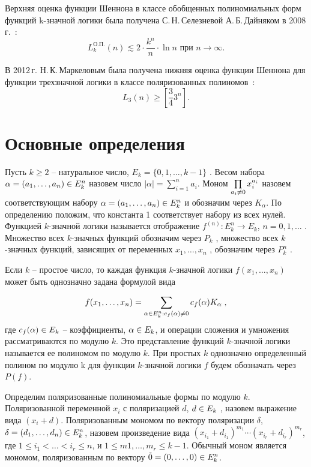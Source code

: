 \documentclass[bibliography=totoc, a4paper, 14pt]{extarticle}
\def\neq{\not=\nobreak\discretionary{}{\usefont{OMS}{cmsy}{m}{n}\char54\usefont{OT1}{cmr}{m}{n}\char61}{}}
\def\in{\mathchar"3232\nobreak\discretionary{}{\usefont{OMS}{cmsy}{m}{n}\char50}{}}
\begin{document}
Верхняя оценка функции Шеннона в классе обобщенных полиномиальных форм функций k\nobreakdash-значной логики была получена
С.\,Н.\,Селезневой А.\,Б.\,Дайняком в 2008\,г.~\cite{sd08}:
$$
L^{\text{О.П.}}_k(n) \lesssim 2\cdot\frac{k ^ n}{n}\cdot \ln n \text{ при } n \rightarrow \infty.
$$

В 2012\,г. Н.\,К.\,Маркеловым была получена нижняя оценка функции Шеннона для функции трехзначной логики в классе
поляризованных полиномов~\cite{mn12}:
$$
L_3(n) \geqslant \left[\frac{3}{4}3^n\right].
$$

\section{Основные определения}

Пусть $k \geqslant 2$ -- натуральное число,
$E_k = \{0, 1, \dots, k - 1\}$
. Весом набора
$\alpha = (a_1, \dots, a_n ) \in E_k^n$ назовем число $|\alpha| = \sum\limits_{i=1}^n a_i$.
Моном $\prod\limits_{a_i\neq0}x_i^{a_i}$ назовем соответствующим набору $\alpha = (a_1, \dots, a_n ) \in E_k^n$ и обозначим
через $K_{\alpha}$. По определению положим, что константа 1 соответствует набору из всех нулей.
Функцией $k$\nobreakdash-значной логики называется отображение $f^{(n)} : E_k^n \rightarrow E_k$,
$n = 0, 1, \dots$ . Множество всех $k$\nobreakdash-значных функций обозначим через $P_k$ , множество
всех $k$\nobreakdash-значных функций, зависящих от переменных $x_1, \dots, x_n$ , обозначим через $P_k^n$ .

Если $k$ -- простое число, то каждая функция $k$\nobreakdash-значной логики $f(x_1 , \dots , x_n)$
может быть однозначно задана формулой вида

$$ f(x_1, \dots, x_n) = \sum_{\alpha \in E_k^n:c_f(\alpha) \neq 0}c_f(\alpha)K_\alpha \; ,$$
где $c_f(\alpha) \in E_k$ -- коэффициенты, $\alpha \in E_k$, и операции сложения и умножения
рассматриваются по модулю $k$. Это представление функций $k$\nobreakdash-значной
логики называется ее полиномом по модулю $k$. При простых $k$ однозначно
определенный полином по модулю k для функции $k$\nobreakdash-значной логики $f$ будем
обозначать через $P(f)$.

Определим поляризованные полиномиальные формы по модулю $k$. Поляризованной переменной $x_i$ с поляризацией $d$,
$d \in E_k$ , назовем выражение вида $(x_i + d)$. Поляризованным мономом по вектору поляризации $\delta$,
$\delta = (d_1, \dots, d_n) \in E_k^n$, назовем произведение вида $(x_{i_1} + d_{i_1} )^{m_1}\cdots(x_{i_r} + d_{i_r})^{m_r}$,
где $1 \leqslant i_1 < \ldots < i_r \leqslant n$, и $1 \leqslant m 1 , \dots , m_r \leqslant k - 1$. Обычный моном является
мономом, поляризованным по вектору $\tilde{0} = (0, \dots, 0) \in E_k^n $.
\end{document}
